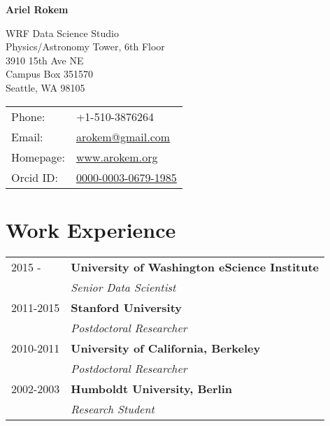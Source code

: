 \documentclass[11pt,fullpage]{article}
\def\name{Ariel Rokem}
\begin{document}
%

\centerline{\Large \bf \name}

\vspace{0.25in}

\begin{minipage}{0.50\linewidth}
  WRF Data Science Studio\\
  Physics/Astronomy Tower, 6th Floor\\
  3910 15th Ave NE\\
  Campus Box 351570\\
  Seattle, WA 98105\\
\end{minipage}
\begin{minipage}{0.50\linewidth}
  \begin{tabular}{ll}
    Phone: & +1-510-3876264 \\
    Email: & \href{mailto:arokem@gmail.com}{arokem@gmail.com} \\
    Homepage: & \href{http://arokem.org/}{www.arokem.org} \\
    Orcid ID: & \href{http://orcid.org/0000-0003-0679-1985}{0000-0003-0679-1985} \\
  \end{tabular}
\end{minipage}

\vspace{-2mm}
\section*{Work Experience}
\vspace{-2mm}
\begin{tabular}{ll}
  2015 -  & {\bf University of Washington eScience Institute}\\
  & \emph{Senior Data Scientist}\\
  2011-2015 & {\bf Stanford University}\\
  & \emph{Postdoctoral Researcher}\\
  2010-2011 & {\bf University of California, Berkeley}\\
  & \emph{Postdoctoral Researcher}\\
  2002-2003 & {\bf Humboldt University, Berlin}\\
  & \emph{Research Student}\\

\end{tabular}

\vspace{-2mm}
\end{document}

